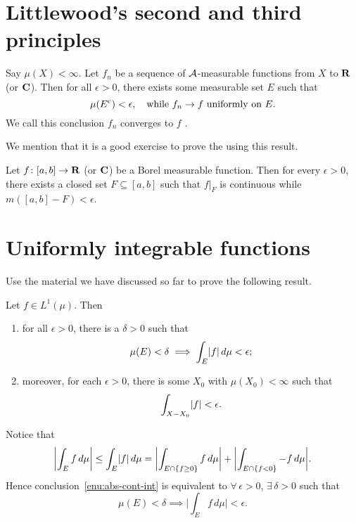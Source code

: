 \section{Littlewood's second and third principles} \label{sec:Littlewood-2nd-3rd}
\begin{namedthm} \label{thm:Egoroff}
    Say $\mu(X)<\infty$. Let ${f_n}$ be a sequence of $\mathcal{A}$-measurable functions from $X$ to $\mathbf{R}$ (or $\mathbf{C}$). Then for all $\epsilon > 0$, there exists some measurable set $E$ such that \[
        \mu(E^{\mathrm{c}}) < \epsilon, \quad \text{while } f_n \to f \text{ uniformly on } E.
    \]
    We call this conclusion $f_n$ converges to $f$ .
\end{namedthm}

We mention that it is a good exercise to prove the  using this result.
\begin{namedthm}
    Let $f\colon [a,b] \to \mathbf{R}$ (or $\mathbf{C}$) be a Borel measurable function. Then for every $\epsilon >0$, there exists a closed set $F \subseteq [a,b]$ such that $f|_F$ is continuous while $m([a,b] - F) < \epsilon$.
\end{namedthm}

\section{Uniformly integrable functions}

Use the material we have discussed so far to prove the following result.
\begin{xca} \label{xca:abs-cont-int-motiv}
Let $f \in L^1(\mu)$. Then
\begin{enumerate}
    \item \label{enu:abs-cont-int}for all $\epsilon > 0$, there is a $\delta > 0$ such that \[
    \mu(E) < \delta \implies \int_E \lvert f \rvert \,d\mu < \epsilon;
\]
    \item moreover, for each $\epsilon > 0$, there is some $X_0$ with $\mu(X_0) < \infty$ such that \[
    \int_{X - X_0} \lvert f \rvert < \epsilon.
\]
\end{enumerate}
\end{xca}

Notice that \[
    \biggl\vert\int_E f \,d\mu \biggr\vert \leq \int_E \lvert f \rvert \,d\mu = \biggl\vert\int_{E \cap \{f \geq 0\}} f\,d\mu\biggr\vert + \biggl\vert\int_{E \cap \{f < 0\}} -f \,d\mu\biggr\vert.\]
Hence conclusion~\ref{enu:abs-cont-int} is equivalent to $\forall\,\epsilon > 0$, $\exists\, \delta > 0$ such that \[
    \mu(E) < \delta \implies \biggl\vert\int_E f \,d\mu\biggr\vert <\epsilon.
\]

